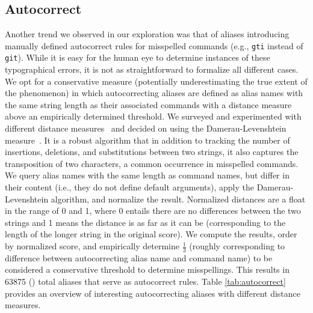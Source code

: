 \subsection{Autocorrect}

Another trend we observed in our exploration was that of aliases introducing manually defined autocorrect rules for misspelled commands (e.g., \verb|gti| instead of \verb|git|).
While it is easy for the human eye to determine instances of these typographical errors, it is not as straightforward to formalize all different cases.
We opt for a conservative measure (potentially underestimating the true extent of the phenomenon) in which autocorrecting aliases are defined as alias names with the same string length as their associated commands with a distance measure above an empirically determined threshold.
We surveyed and experimented with different distance measures~\cite{navarro:01} and decided on using the Damerau-Levenshtein measure~\cite{damerau:64}.
It is a robust algorithm that in addition to tracking the number of insertions, deletions, and substitutions between two strings, it also captures the transposition of two characters, a common occurrence in misspelled commands.  
We query alias names with the same length as command names, but differ in their content (i.e., they do not define default arguments), apply the Damerau-Levenshtein algorithm, and normalize the result.
Normalized distances are a float in the range of 0 and 1, where 0 entails there are no differences between the two strings and 1 means the distance is as far as it can be (corresponding to the length of the longer string in the original score).
We compute the results, order by normalized score, and empirically determine $\frac{1}{3}$ (roughly corresponding to  difference between autocorrecting alias name and command name) to be considered a conservative threshold to determine misspellings.
This results in \num{63875} () total aliases that serve as autocorrect rules.
Table \ref{tab:autocorrect} provides an overview of interesting autocorrecting aliases with different distance measures.

